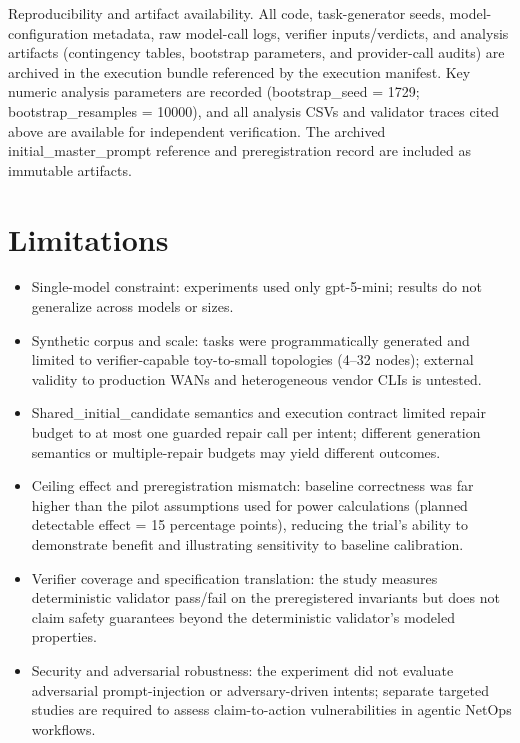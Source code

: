 \documentclass[conference]{IEEEtran}
\begin{document}
Reproducibility and artifact availability. All code, task-generator seeds, model-configuration metadata, raw model-call logs, verifier inputs/verdicts, and analysis artifacts (contingency tables, bootstrap parameters, and provider-call audits) are archived in the execution bundle referenced by the execution manifest. Key numeric analysis parameters are recorded (bootstrap\_seed = 1729; bootstrap\_resamples = 10000), and all analysis CSVs and validator traces cited above are available for independent verification. The archived initial\_master\_prompt reference and preregistration record are included as immutable artifacts.

\section{Limitations}
\begin{itemize}
\item Single-model constraint: experiments used only gpt-5-mini; results do not generalize across models or sizes.
\item Synthetic corpus and scale: tasks were programmatically generated and limited to verifier-capable toy-to-small topologies (4--32 nodes); external validity to production WANs and heterogeneous vendor CLIs is untested.
\item Shared\_initial\_candidate semantics and execution contract limited repair budget to at most one guarded repair call per intent; different generation semantics or multiple-repair budgets may yield different outcomes.
\item Ceiling effect and preregistration mismatch: baseline correctness was far higher than the pilot assumptions used for power calculations (planned detectable effect = 15 percentage points), reducing the trial's ability to demonstrate benefit and illustrating sensitivity to baseline calibration.
\item Verifier coverage and specification translation: the study measures deterministic validator pass/fail on the preregistered invariants but does not claim safety guarantees beyond the deterministic validator's modeled properties.
\item Security and adversarial robustness: the experiment did not evaluate adversarial prompt-injection or adversary-driven intents; separate targeted studies are required to assess claim-to-action vulnerabilities in agentic NetOps workflows.
\end{itemize}
\end{document}
